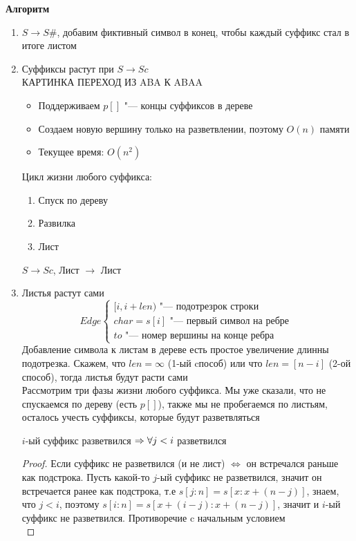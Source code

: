 \textbf{Алгоритм}
\begin{enumerate}
\item
	$ S \to S\# $, добавим фиктивный символ в конец, чтобы каждый суффикс стал в итоге листом
\item
	Суффиксы растут при $ S \to Sc $ \\ 
	КАРТИНКА ПЕРЕХОД ИЗ ABA К ABAA
	\begin{itemize}
	\item
		Поддерживаем $ p[] $ "--- концы суффиксов в дереве
	\item
		Создаем новую вершину только на разветвлении, поэтому $ O(n) $ памяти
	\item
		Текущее время: $ O(n^2) $
	\end{itemize}
	Цикл жизни любого суффикса:
	\begin{enumerate}
	\item
		Спуск по дереву
	\item
		Развилка
	\item
		Лист
	\end{enumerate}
	\begin{lemma}
		$ S \to Sc $, Лист $ \to $ Лист
	\end{lemma}
\item
	Листья растут сами
	\begin{equation*}
		Edge
		\begin{cases}
			[i, i + len) \text{ "--- подотрезрок строки } \\
			char = s[i] \text{ "--- первый символ на ребре } \\
			to \text{ "--- номер вершины на конце ребра } 
		\end{cases}
	\end{equation*}
	Добавление символа к листам в дереве есть простое увеличение длинны подотрезка. Скажем, что $len = \infty$ (1-ый cпособ) или что $len = [n - i]$ (2-ой способ), тогда листья будут расти сами \\
	Рассмотрим три фазы жизни любого суффикса. Мы уже сказали, что не спускаемся по дереву (есть $p[]$), также мы не пробегаемся по листьям, осталось учесть суффиксы, которые будут разветвляться
	\begin{lemma}
		$i$-ый суффикс разветвился $\Rightarrow \forall j < i$ разветвился
	\end{lemma}
	\begin{proof}
		Если суффикс не разветвился (и не лист) $\Leftrightarrow$ он встречался раньше как подстрока. Пусть какой-то $j$-ый суффикс не разветвился, значит он встречается ранее как подстрока, т.е $s[j:n] = s[x:x+(n-j)]$, знаем, что $j < i$, поэтому $s[i:n] = s[x + (i-j) : x + (n-j)]$, значит и $i$-ый суффикс не разветвился. Противоречие c начальным условием \\

\end{proof}
\end{enumerate}
